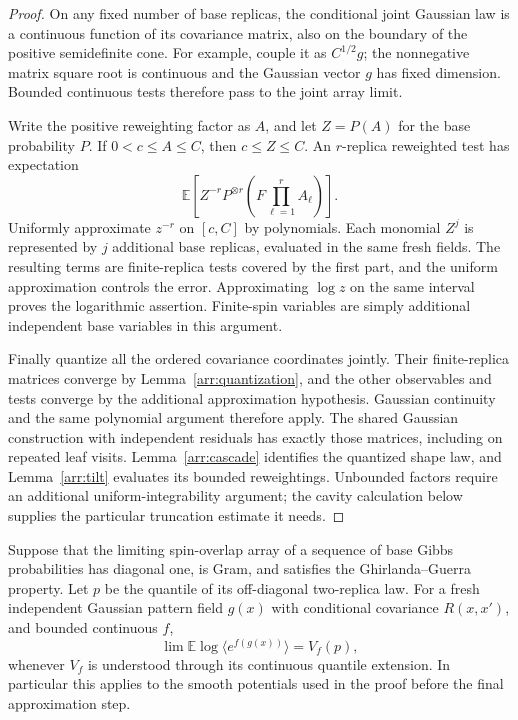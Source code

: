\begin{proof}
On any fixed number of base replicas, the conditional joint Gaussian
law is a continuous function of its covariance matrix, also on the
boundary of the positive semidefinite cone.  For example, couple it as
$C^{1/2}g$; the nonnegative matrix square root is continuous and the
Gaussian vector $g$ has fixed dimension.  Bounded continuous tests
therefore pass to the joint array limit.

Write the positive reweighting factor as $A$, and let $Z=P(A)$ for the
base probability $P$.  If $0<c\leq A\leq C$, then $c\leq Z\leq C$.
An $r$-replica reweighted test has expectation
\[
 \mathbb E\left[
   Z^{-r}P^{\otimes r}\left(F\prod_{\ell=1}^r A_\ell\right)
 \right].
\]
Uniformly approximate $z^{-r}$ on $[c,C]$ by polynomials.  Each monomial
$Z^j$ is represented by $j$ additional base replicas, evaluated in the
same fresh fields.  The resulting terms are finite-replica tests covered
by the first part, and the uniform approximation controls the error.
Approximating $\log z$ on the same interval proves the logarithmic
assertion.  Finite-spin variables are simply additional independent base
variables in this argument.

Finally quantize all the ordered covariance coordinates jointly.  Their
finite-replica matrices converge by
Lemma~\ref{arr:quantization}, and the other observables and tests converge
by the additional approximation hypothesis.  Gaussian continuity and
the same polynomial argument therefore apply.  The shared Gaussian construction with
independent residuals has exactly those matrices, including on repeated
leaf visits.  Lemma~\ref{arr:cascade} identifies the quantized shape law,
and Lemma~\ref{arr:tilt} evaluates its bounded reweightings.  Unbounded
factors require an additional uniform-integrability argument; the cavity
calculation below supplies the particular truncation estimate it needs.
\end{proof}

\begin{lemma}
\label{arr:fresh-pattern}
Suppose that the limiting spin-overlap array of a sequence of base Gibbs
probabilities has diagonal one, is Gram, and satisfies the
Ghirlanda--Guerra property.  Let $p$ be the quantile of its off-diagonal
two-replica law.  For a fresh independent Gaussian pattern field $g(x)$
with conditional covariance $R(x,x')$, and bounded continuous $f$,
\begin{equation}
 \lim\mathbb E\log\langle e^{f(g(x))}\rangle=V_f(p),
 \label{arr:fresh-pattern-value}
\end{equation}
whenever $V_f$ is understood through its continuous quantile extension.
In particular this applies to the smooth potentials used in the proof
before the final approximation step.
\end{lemma}

